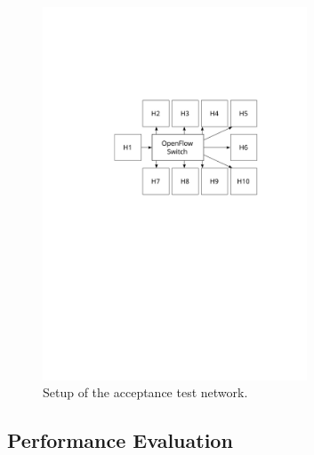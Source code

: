 \documentclass[a4paper,
		12pt,
		parskip=full,
		titlepage
		]{scrartcl}
\begin{document}
\begin{figure}
\centering
\includegraphics[width=0.7\textwidth]{images/ofswitch-acctest}
\caption{Setup of the acceptance test network.}
\label{fig:ofswitch-acctest}
\end{figure}

\subsection{Performance Evaluation}
\end{document}
